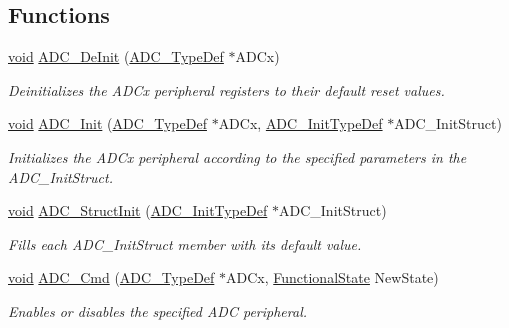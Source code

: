 \subsection*{Functions}
\begin{DoxyCompactItemize}
\item 
\hyperlink{usb__devapi_8h_afabf60e7f57651d6d595a02c75f07cd0}{void} \hyperlink{group___a_d_c___exported___functions_ga31fa6bc09de17125e9db2830ce77c09b}{A\+D\+C\+\_\+\+De\+Init} (\hyperlink{struct_a_d_c___type_def}{A\+D\+C\+\_\+\+Type\+Def} $\ast$A\+D\+Cx)
\begin{DoxyCompactList}\small\item\em Deinitializes the A\+D\+Cx peripheral registers to their default reset values. \end{DoxyCompactList}\item 
\hyperlink{usb__devapi_8h_afabf60e7f57651d6d595a02c75f07cd0}{void} \hyperlink{group___a_d_c___exported___functions_gabbab6038cf8691404350625e477254f9}{A\+D\+C\+\_\+\+Init} (\hyperlink{struct_a_d_c___type_def}{A\+D\+C\+\_\+\+Type\+Def} $\ast$A\+D\+Cx, \hyperlink{struct_a_d_c___init_type_def}{A\+D\+C\+\_\+\+Init\+Type\+Def} $\ast$A\+D\+C\+\_\+\+Init\+Struct)
\begin{DoxyCompactList}\small\item\em Initializes the A\+D\+Cx peripheral according to the specified parameters in the A\+D\+C\+\_\+\+Init\+Struct. \end{DoxyCompactList}\item 
\hyperlink{usb__devapi_8h_afabf60e7f57651d6d595a02c75f07cd0}{void} \hyperlink{group___a_d_c___exported___functions_ga6c6e754d1d0a98d56e465efaf73272ec}{A\+D\+C\+\_\+\+Struct\+Init} (\hyperlink{struct_a_d_c___init_type_def}{A\+D\+C\+\_\+\+Init\+Type\+Def} $\ast$A\+D\+C\+\_\+\+Init\+Struct)
\begin{DoxyCompactList}\small\item\em Fills each A\+D\+C\+\_\+\+Init\+Struct member with its default value. \end{DoxyCompactList}\item 
\hyperlink{usb__devapi_8h_afabf60e7f57651d6d595a02c75f07cd0}{void} \hyperlink{group___a_d_c___exported___functions_ga40882d399e3371755ed610c1134e634e}{A\+D\+C\+\_\+\+Cmd} (\hyperlink{struct_a_d_c___type_def}{A\+D\+C\+\_\+\+Type\+Def} $\ast$A\+D\+Cx, \hyperlink{agilefox_2library_2inc_2stm32f10x__type_8h_ac9a7e9a35d2513ec15c3b537aaa4fba1}{Functional\+State} New\+State)
\begin{DoxyCompactList}\small\item\em Enables or disables the specified A\+DC peripheral. \end{DoxyCompactList}\item 

\end{DoxyCompactItemize}
